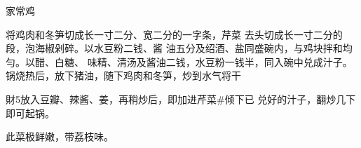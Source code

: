 \begin{recipe}{家常鸡}

\ingredients


\cooking

将鸡肉和冬笋切成长一寸二分、宽二分的一字条，芹菜 去头切成长一寸二分的段，泡海椒剁碎。以水豆粉二钱、酱 油五分及绍酒、盐同盛碗内，与鸡块拌和均勻。以醋、白糖、 味精、清汤及酱油二钱，水豆粉一钱半，同入碗中兑成汁子。 锅烧热后，放下猪油，随下鸡肉和冬笋，炒到水气将干

財5放入豆瓣、辣酱、姜，再稍炒后，即加进芹菜#倾下已 兑好的汁子，翻炒几下即可起锅。

\notes

此菜极鲜嫩，带荔枝味。

\end{recipe}

